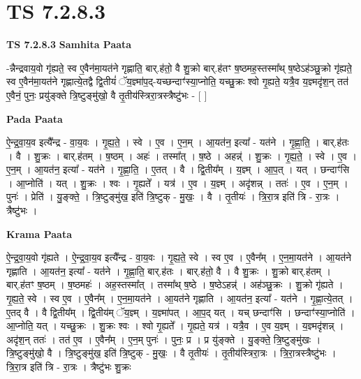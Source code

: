 \documentclass[17pt]{extarticle}
\begin{document}
\section{ TS 7.2.8.3 }

\textbf{TS 7.2.8.3 } \newline
\textbf{Samhita Paata} \newline

-न्नैन्द्रवाय॒वो गृ॑ह्यते॒ स्व ए॒वैन॑मा॒यत॑ने गृह्णाति॒ बार्.ह॑तो॒ वै शु॒क्रो बार्.ह॑तꣳ ष॒ष्ठमह॒स्तस्मा᳚थ् ष॒ष्ठेऽह॑ञ्छु॒क्रो गृ॑ह्यते॒ स्व ए॒वैन॑मा॒यत॑ने गृह्णात्ये॒तद्वै द्वि॒तीयं॑ ॅय॒ज्ञ्मा॑प॒द्-यच्छन्दाꣳ॑स्या॒प्नोति॒ यच्छु॒क्रः श्वो गृ॒ह्यते॒ यत्रै॒व य॒ज्ञ्मदृ॑श॒न् तत॑ ए॒वैनं॒ पुनः॒ प्रयु॑ङ्क्ते त्रि॒ष्टुङ्मु॑खो॒ वै तृ॒तीय॑स्त्रिरा॒त्रस्त्रैष्टु॑भः - [  ] \newline

\textbf{Pada Paata} \newline

ऐ॒न्द्र॒वा॒य॒व इत्यै᳚न्द्र - वा॒य॒वः । गृ॒ह्य॒ते॒ । स्वे । ए॒व । ए॒न॒म् । आ॒यत॑न॒ इत्या᳚ - यत॑ने । गृ॒ह्णा॒ति॒ । बार्.ह॑तः । वै । शु॒क्रः । बार्.ह॑तम् । ष॒ष्ठम् । अहः॑ । तस्मा᳚त् । ष॒ष्ठे । अहन्न्॑ । शु॒क्रः । गृ॒ह्य॒ते॒ । स्वे । ए॒व । ए॒न॒म् । आ॒यत॑न॒ इत्या᳚ - यत॑ने । गृ॒ह्णा॒ति॒ । ए॒तत् । वै । द्वि॒तीय᳚म् । य॒ज्ञ्म् । आ॒प॒त् । यत् । छन्दाꣳ॑सि । आ॒प्नोति॑ । यत् । शु॒क्रः । श्वः । गृ॒ह्यते᳚ । यत्र॑ । ए॒व । य॒ज्ञ्म् । अदृ॑शन्न् । ततः॑ । ए॒व । ए॒न॒म् । पुनः॑ । प्रेति॑ । यु॒ङ्क्ते॒ । त्रि॒ष्टुङ्मु॑ख॒ इति॑ त्रि॒ष्टुक् - मु॒खः॒ । वै । तृ॒तीयः॑ । त्रि॒रा॒त्र इति॑ त्रि - रा॒त्रः । त्रैष्टु॑भः ।  \newline


\textbf{Krama Paata} \newline

ऐ॒न्द्र॒वा॒य॒वो गृ॑ह्यते । ऐ॒न्द्र॒वा॒य॒व इत्यै᳚न्द्र - वा॒य॒वः । गृ॒ह्य॒ते॒ स्वे । स्व ए॒व । ए॒वैन᳚म् । ए॒न॒मा॒यत॑ने । आ॒यत॑ने गृह्णाति । आ॒यत॑न॒ इत्या᳚ - यत॑ने । गृ॒ह्णा॒ति॒ बार्.ह॑तः । बार्.ह॑तो॒ वै । वै शु॒क्रः । शु॒क्रो बार्.ह॑तम् । बार्.ह॑तꣳ ष॒ष्ठम् । ष॒ष्ठमहः॑ । अह॒स्तस्मा᳚त् । तस्मा᳚थ् ष॒ष्ठे । ष॒ष्ठेऽहन्न्॑ । अह॑ञ्छु॒क्रः । शु॒क्रो गृ॑ह्यते । गृ॒ह्य॒ते॒ स्वे । स्व ए॒व । ए॒वैन᳚म् । ए॒न॒मा॒यत॑ने । आ॒यत॑ने गृह्णाति । आ॒यत॑न॒ इत्या᳚ - यत॑ने । गृ॒ह्णा॒त्ये॒तत् । ए॒तद् वै । वै द्वि॒तीय᳚म् । द्वि॒तीय॑म् ॅय॒ज्ञ्म् । य॒ज्ञ्मा॑पत् । आ॒प॒द् यत् । यच् छन्दाꣳ॑सि । छन्दाꣳ॑स्या॒प्नोति॑ । आ॒प्नोति॒ यत् । यच्छु॒क्रः । शु॒क्रः श्वः । श्वो गृ॒ह्यते᳚ । गृ॒ह्यते॒ यत्र॑ । यत्रै॒व । ए॒व य॒ज्ञ्म् । य॒ज्ञ्मदृ॑शन्न् । अदृ॑श॒न् ततः॑ । तत॑ ए॒व । ए॒वैन᳚म् । ए॒न॒म् पुनः॑ । पुनः॒ प्र । प्र यु॑ङ्‍क्ते । यु॒ङ्‍क्ते॒ त्रि॒ष्टुङ्‍मु॑खः । त्रि॒ष्टुङ्‍मु॑खो॒ वै । त्रि॒ष्टुङ्‍मु॑ख॒ इति॑ त्रि॒ष्टुक् - मु॒खः॒ । वै तृ॒तीयः॑ । तृ॒तीय॑स्त्रिरा॒त्रः । त्रि॒रा॒त्रस्त्रैष्टु॑भः । त्रि॒रा॒त्र इति॑ त्रि - रा॒त्रः । त्रैष्टु॑भः शु॒क्रः \newline
\end{document}
